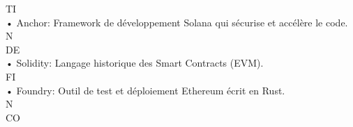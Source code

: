 TI\\
• Anchor: Framework de développement Solana qui sécurise et accélère le code.\\
\vspace{0.5em}
\vspace{0.5em}
\vspace{0.5em}
\vspace{0.5em}
N\\
DE\\
• Solidity: Langage historique des Smart Contracts (EVM).\\
\vspace{0.5em}
\vspace{0.5em}
\vspace{0.5em}
\vspace{0.5em}
FI\\
• Foundry: Outil de test et déploiement Ethereum écrit en Rust.\\
\vspace{0.5em}
\vspace{0.5em}
\vspace{0.5em}
\vspace{0.5em}
N\\
CO\\
